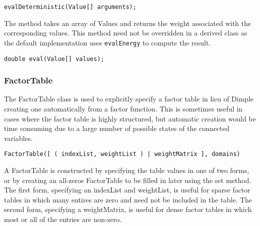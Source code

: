 \begin{lstlisting}
evalDeterministic(Value[] arguments);
\end{lstlisting}


The method takes an array of Values and returns the weight associated with the corresponding values.  This method need not be overridden in a derived class as the default implementation uses \texttt{evalEnergy} to compute the result.

\begin{lstlisting}
double eval(Value[] values);
\end{lstlisting}

\fi

\subsubsection{FactorTable}
\label{sec:FactorTable}

The FactorTable class is used to explicitly specify a factor table in lieu of Dimple creating one automatically from a factor function.  This is sometimes useful in cases where the factor table is highly structured, but automatic creation would be time consuming due to a large number of possible states of the connected variables.


\ifmatlab
\begin{lstlisting}
FactorTable([ ( indexList, weightList ) | weightMatrix ], domains)
\end{lstlisting}

A FactorTable is constructed by specifying the table values in one of two forms, or by creating an all-zeros FactorTable to be filled in later using the set method.  The first form, specifying an indexList and weightList, is useful for sparse factor tables in which many entires are zero and need not be included in the table.  The second form, specifying a weightMatrix, is useful for dense factor tables in which most or all of the entries are non-zero.


